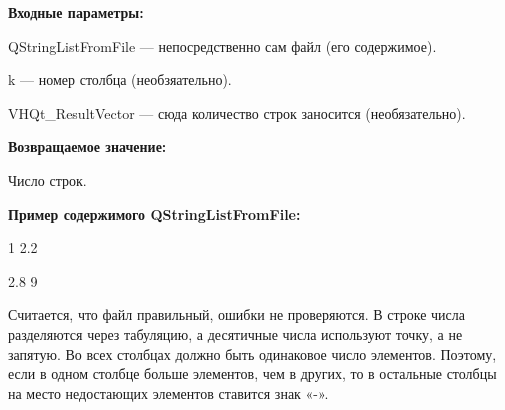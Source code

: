 \textbf{Входные параметры:}

QStringListFromFile --- непосредственно сам файл (его содержимое).

k --- номер столбца (необзяательно).

 VHQt\_ResultVector --- сюда количество строк заносится (необязательно).

\textbf{Возвращаемое значение:}

Число строк.

\textbf{Пример содержимого QStringListFromFile:}

1	2.2

2.8	9

Считается, что файл правильный, ошибки не проверяются. В строке числа разделяются через табуляцию, а десятичные числа используют точку, а не запятую. Во всех столбцах должно быть одинаковое число элементов. Поэтому, если в одном столбце больше элементов, чем в других, то в остальные столбцы на место недостающих элементов ставится знак «-».
